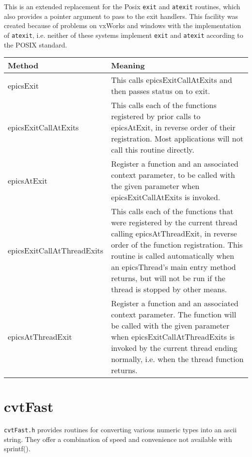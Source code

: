 This is an extended replacement for the Posix \verb|exit| and \verb|atexit| routines, which also provides a pointer argument to pass 
to the exit handlers. This facility was created because of problems on vxWorks and windows with the implementation of 
\verb|atexit|, i.e. neither of these systems implement \verb|exit| and \verb|atexit| according to the POSIX standard.
\begin{center}
\begin{longtable}{p{2.0in}p{4.4in}}
\textbf{Method} & \textbf{Meaning}\\
\hline
epicsExit & This calls epicsExitCallAtExits and then passes status on to exit.\\
epicsExitCallAtExits & This calls each of the functions registered by prior calls to epicsAtExit, in reverse order of their registration.  Most applications will not call this routine directly.\\
epicsAtExit & Register a function and an associated context parameter, to be called with the given parameter when epicsExitCallAtExits is invoked.\\
epicsExitCallAtThreadExits & This calls each of the functions that were registered by the current thread calling epicsAtThreadExit, in reverse order of the function registration.  This routine is called automatically when an epicsThread's main entry method returns, but will not be run if the thread is stopped by other means.\\
epicsAtThreadExit & Register a function and an associated context parameter. The function will be called with the given parameter when epicsExitCallAtThreadExits is invoked by the current thread ending normally, i.e. when the thread function returns.
\end{longtable}

\end{center}


\section{cvtFast}

\verb|cvtFast.h| provides routines for converting various numeric types into an ascii string. They offer a combination of 
speed and convenience not available with sprintf().

